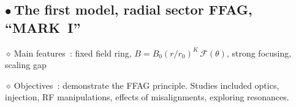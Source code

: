 \documentclass[12pt]{article}
\newcommand{\nib}{\noindent \ensuremath{\bullet~}}
\newcommand{\nid}{\noindent \ensuremath{\diamond~}}
\begin{document}
\clearpage

\subsection*{\LARGE  \nib   The first model, radial sector FFAG, ``MARK~I''}

\Large   

\nid Main features~:  fixed field ring, $B=B_0 (r/r_0)^K \, \mathcal{F}(\theta)$, strong focusing, scaling gap

\smallskip

\nid Objectives~: demonstrate the FFAG principle. Studies included optics, injection,  RF manipulations, 
effects of misalignments, exploring resonances. 

~
\end{document}
